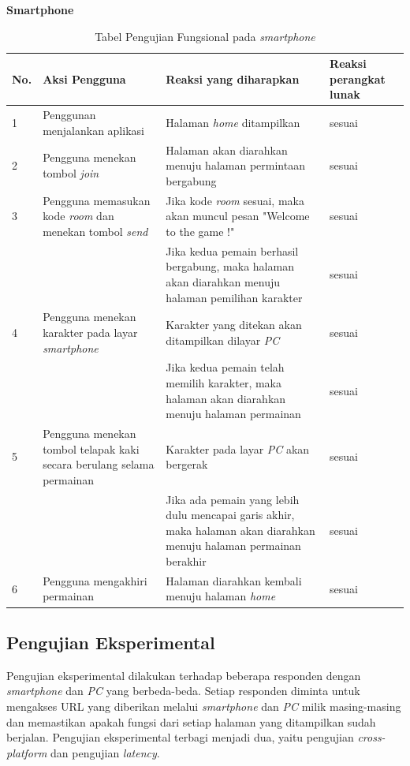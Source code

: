 \textbf{Smartphone} \\
\begin{table}[H]
	\centering
	\caption{Tabel Pengujian Fungsional pada \textit{smartphone}}
	\begin{tabular}{|p{0.35cm}| p{3.5cm}| p{7cm}| p{2.5cm}|} \hline
		No. & Aksi Pengguna & Reaksi yang diharapkan & Reaksi perangkat lunak \\ \hline
		1 & Penggunan menjalankan aplikasi & Halaman \textit{home} ditampilkan & sesuai \\ \hline 
		2 & Pengguna menekan tombol \textit{join} & Halaman akan diarahkan menuju halaman permintaan bergabung & sesuai \\ \hline
		3 & Pengguna memasukan kode \textit{room} dan menekan tombol \textit{send} & Jika kode \textit{room} sesuai, maka akan muncul pesan "Welcome to the game !" & sesuai \\ \hline
		& & Jika kedua pemain berhasil bergabung, maka halaman akan diarahkan menuju halaman pemilihan karakter & sesuai \\ \hline
		4 & Pengguna menekan karakter pada layar \textit{smartphone} & Karakter yang ditekan akan ditampilkan dilayar \textit{PC} & sesuai \\ \hline
		& & Jika kedua pemain telah memilih karakter, maka halaman akan diarahkan menuju halaman permainan & sesuai \\ \hline
		5 & Pengguna menekan tombol telapak kaki secara berulang selama permainan & Karakter pada layar \textit{PC} akan bergerak & sesuai\\ \hline
		& & Jika ada pemain yang lebih dulu mencapai garis akhir, maka halaman akan diarahkan menuju halaman permainan berakhir & sesuai \\ \hline
		6 & Pengguna mengakhiri permainan & Halaman diarahkan kembali menuju halaman \textit{home} & sesuai \\ \hline
	\end{tabular}
	\label{table:fungsionalSmartphone}
\end{table}
\subsection{Pengujian Eksperimental}
Pengujian eksperimental dilakukan terhadap beberapa responden dengan \textit{smartphone} dan \textit{PC} yang berbeda-beda. Setiap responden diminta untuk mengakses URL yang diberikan melalui \textit{smartphone} dan \textit{PC} milik masing-masing dan memastikan apakah fungsi dari setiap halaman yang ditampilkan sudah berjalan. Pengujian eksperimental terbagi menjadi dua, yaitu pengujian \textit{cross-platform} dan pengujian \textit{latency}.

